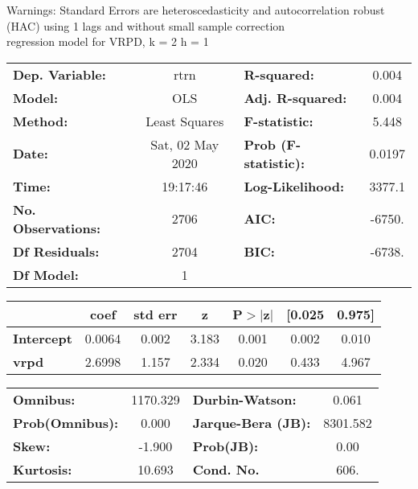 Warnings: \newline
 [1] Standard Errors are heteroscedasticity and autocorrelation robust (HAC) using 1 lags and without small sample correction\\ 

regression model for VRPD, k = 2 h = 1\begin{center}
\begin{tabular}{lclc}
\toprule
\textbf{Dep. Variable:}    &       rtrn       & \textbf{  R-squared:         } &     0.004   \\
\textbf{Model:}            &       OLS        & \textbf{  Adj. R-squared:    } &     0.004   \\
\textbf{Method:}           &  Least Squares   & \textbf{  F-statistic:       } &     5.448   \\
\textbf{Date:}             & Sat, 02 May 2020 & \textbf{  Prob (F-statistic):} &   0.0197    \\
\textbf{Time:}             &     19:17:46     & \textbf{  Log-Likelihood:    } &    3377.1   \\
\textbf{No. Observations:} &        2706      & \textbf{  AIC:               } &    -6750.   \\
\textbf{Df Residuals:}     &        2704      & \textbf{  BIC:               } &    -6738.   \\
\textbf{Df Model:}         &           1      & \textbf{                     } &             \\
\bottomrule
\end{tabular}
\begin{tabular}{lcccccc}
                   & \textbf{coef} & \textbf{std err} & \textbf{z} & \textbf{P$> |$z$|$} & \textbf{[0.025} & \textbf{0.975]}  \\
\midrule
\textbf{Intercept} &       0.0064  &        0.002     &     3.183  &         0.001        &        0.002    &        0.010     \\
\textbf{vrpd}      &       2.6998  &        1.157     &     2.334  &         0.020        &        0.433    &        4.967     \\
\bottomrule
\end{tabular}
\begin{tabular}{lclc}
\textbf{Omnibus:}       & 1170.329 & \textbf{  Durbin-Watson:     } &    0.061  \\
\textbf{Prob(Omnibus):} &   0.000  & \textbf{  Jarque-Bera (JB):  } & 8301.582  \\
\textbf{Skew:}          &  -1.900  & \textbf{  Prob(JB):          } &     0.00  \\
\textbf{Kurtosis:}      &  10.693  & \textbf{  Cond. No.          } &     606.  \\
\bottomrule
\end{tabular}
\end{center}

